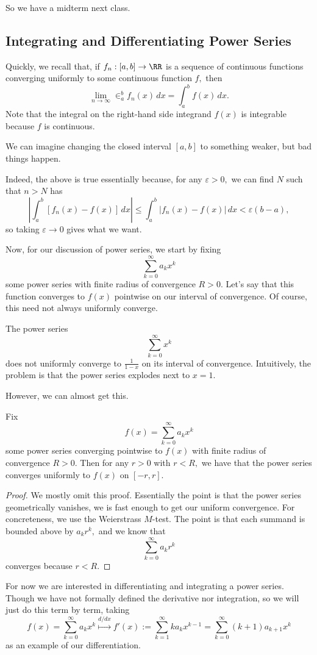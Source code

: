 















So we have a midterm next class.

\subsection{Integrating and Differentiating Power Series}
Quickly, we recall that, if $f_n:[a,b]\to\RR$ is a sequence of continuous functions converging uniformly to some continuous function $f,$ then
\[\lim_{n\to\infty}\in_a^bf_n(x)\,dx=\int_a^bf(x)\,dx.\]
Note that the integral on the right-hand side integrand $f(x)$ is integrable because $f$ is continuous.
\begin{remark}
	We can imagine changing the closed interval $[a,b]$ to something weaker, but bad things happen.
\end{remark}
Indeed, the above is true essentially because, for any $\varepsilon>0,$ we can find $N$ such that $n>N$ has
\[\left|\int_a^b[f_n(x)-f(x)]\,dx\right|\le\int_a^b|f_n(x)-f(x)|\,dx<\varepsilon(b-a),\]
so taking $\varepsilon\to0$ gives what we want.

Now, for our discussion of power series, we start by fixing
\[\sum_{k=0}^\infty a_kx^k\]
some power series with finite radius of convergence $R>0.$ Let's say that this function converges to $f(x)$ pointwise on our interval of convergence. Of course, this need not always uniformly converge.
\begin{example}
	The power series
	\[\sum_{k=0}^\infty x^k\]
	does not uniformly converge to $\frac1{1-x}$ on its interval of convergence. Intuitively, the problem is that the power series explodes next to $x=1.$
\end{example}
However, we can almost get this.
\begin{proposition}
	Fix
	\[f(x)=\sum_{k=0}^\infty a_kx^k\]
	some power series converging pointwise to $f(x)$ with finite radius of convergence $R>0.$ Then for any $r>0$ with $r<R,$ we have that the power series converges uniformly to $f(x)$ on $[-r,r].$
\end{proposition}
\begin{proof}
	We mostly omit this proof. Essentially the point is that the power series geometrically vanishes, we is fast enough to get our uniform convergence. For concreteness, we use the Weierstrass $M$-test. The point is that each summand is bounded above by $a_kr^k,$ and we know that
	\[\sum_{k=0}^\infty a_kr^k\]
	converges because $r<R.$
\end{proof}
For now we are interested in differentiating and integrating a power series. Though we have not formally defined the derivative nor integration, so we will just do this term by term, taking
\[f(x)=\sum_{k=0}^\infty a_kx^k\stackrel{d/dx}\longmapsto f'(x):=\sum_{k=1}^\infty ka_kx^{k-1}=\sum_{k=0}^\infty(k+1)a_{k+1}x^k\]
as an example of our differentiation.

